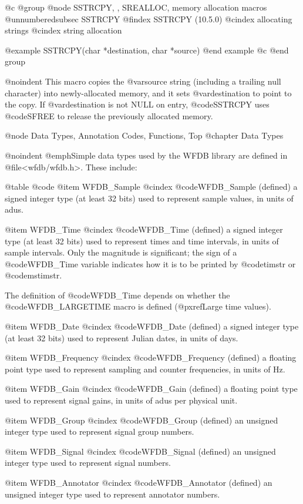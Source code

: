 {{{{{{{{{@c @group
@node     SSTRCPY, , SREALLOC, memory allocation macros
@unnumberedsubsec SSTRCPY
@findex SSTRCPY (10.5.0)
@cindex allocating strings
@cindex string allocation

@example
SSTRCPY(char *destination, char *source)
@end example
@c @end group

@noindent
This macro copies the @var{source} string (including a trailing null character)
into newly-allocated memory, and it sets @var{destination} to point to the copy.
If @var{destination} is not NULL on entry, @code{SSTRCPY} uses @code{SFREE}
to release the previously allocated memory.

@node     Data Types, Annotation Codes, Functions, Top
@chapter Data Types

@noindent
@emph{Simple data types} used by the WFDB library are defined in
@file{<wfdb/wfdb.h>}.  These include:

@table @code
@item WFDB_Sample
@cindex @code{WFDB_Sample} (defined)
a signed integer type (at least 32 bits) used to represent sample
values, in units of adus.

@item WFDB_Time
@cindex @code{WFDB_Time} (defined)
a signed integer type (at least 32 bits) used to represent times and
time intervals, in units of sample intervals.  Only the magnitude is
significant;  the sign of a @code{WFDB_Time} variable indicates how it
is to be printed by @code{timstr} or @code{mstimstr}.

The definition of @code{WFDB_Time} depends on whether the @code{WFDB_LARGETIME}
macro is defined (@pxref{Large time values}).

@item WFDB_Date
@cindex @code{WFDB_Date} (defined)
a signed integer type (at least 32 bits) used to represent Julian dates,
in units of days.

@item WFDB_Frequency
@cindex @code{WFDB_Frequency} (defined)
a floating point type used to represent sampling and counter
frequencies, in units of Hz.

@item WFDB_Gain
@cindex @code{WFDB_Gain} (defined)
a floating point type used to represent signal gains, in units of adus
per physical unit.

@item WFDB_Group
@cindex @code{WFDB_Group} (defined)
an unsigned integer type used to represent signal group numbers.

@item WFDB_Signal
@cindex @code{WFDB_Signal} (defined)
an unsigned integer type used to represent signal numbers.

@item WFDB_Annotator
@cindex @code{WFDB_Annotator} (defined)
an unsigned integer type used to represent annotator numbers.

}}}}}}}}}

